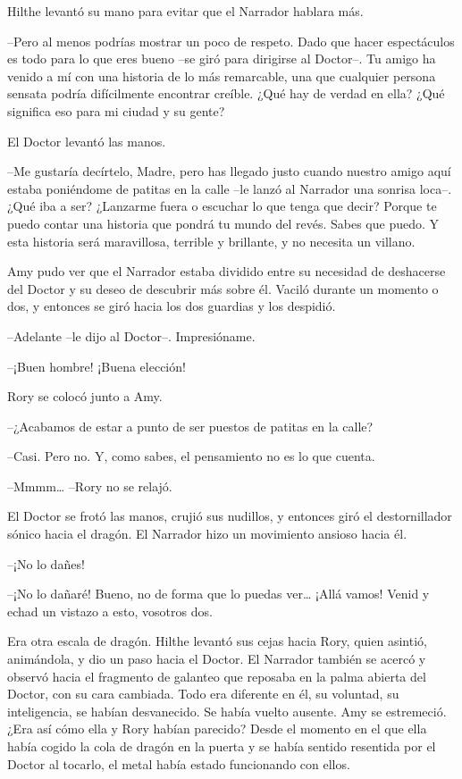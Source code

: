 {Hilthe levantó su mano para evitar que el Narrador hablara más.}

{--Pero al menos podrías mostrar un poco de respeto. Dado que hacer
	espectáculos es todo para lo que eres bueno --se giró para dirigirse al
	Doctor--. Tu amigo ha venido a mí con una historia de lo más remarcable,
	una que cualquier persona sensata podría difícilmente encontrar creíble.
	¿Qué hay de verdad en ella? ¿Qué significa eso para mi ciudad y su
gente?}

{El Doctor levantó las manos.}

{--Me gustaría decírtelo, Madre, pero has llegado justo cuando nuestro
	amigo aquí estaba poniéndome de patitas en la calle --le lanzó al
	Narrador una sonrisa loca--. ¿Qué iba a ser? ¿Lanzarme fuera o escuchar
	lo que tenga que decir? Porque te puedo contar una historia que pondrá
	tu mundo del revés. Sabes que puedo. Y esta historia será maravillosa,
terrible y brillante, y no necesita un villano.}

{Amy pudo ver que el Narrador estaba dividido entre su necesidad de
	deshacerse del Doctor y su deseo de descubrir más sobre él. Vaciló
	durante un momento o dos, y entonces se giró hacia los dos guardias y
los despidió.}

{--Adelante --le dijo al Doctor--. Impresióname.}

{--¡Buen hombre! ¡Buena elección!}

{Rory se colocó junto a Amy.}

{--¿Acabamos de estar a punto de ser puestos de patitas en la calle?}

{--Casi. Pero no. Y, como sabes, el pensamiento no es lo que cuenta.}

{--Mmmm\ldots{} --Rory no se relajó.}

{El Doctor se frotó las manos, crujió sus nudillos, y entonces giró el
	destornillador sónico hacia el dragón. El Narrador hizo un movimiento
ansioso hacia él.}

{--¡No lo dañes!}

{--¡No lo dañaré! Bueno, no de forma que lo puedas ver\ldots{} ¡Allá
vamos! Venid y echad un vistazo a esto, vosotros dos.}

{Era otra escala de dragón. Hilthe levantó sus cejas hacia Rory, quien
	asintió, animándola, y dio un paso hacia el Doctor. El Narrador también
	se acercó y observó hacia el fragmento de galanteo que reposaba en la
	palma abierta del Doctor, con su cara cambiada. Todo era diferente en
	él, su voluntad, su inteligencia, se habían desvanecido. Se había vuelto
	ausente. Amy se estremeció. ¿Era así cómo ella y Rory habían parecido?
	Desde el momento en el que ella había cogido la cola de dragón en la
	puerta y se había sentido resentida por el Doctor al tocarlo, el metal
había estado funcionando con ellos.}

